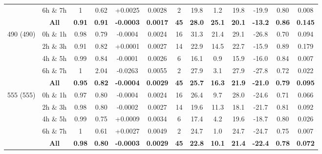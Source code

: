 \documentclass[onecolumn,3p,letterpaper,11pt]{elsarticle}
\begin{document}
\begin{table}[htbp!]
\begin{tabular}{ccccccccccccc}
                            &  6h $\&$ 7h  & 1       & 0.62    & +0.0025 & 0.0028      & 2   & 19.8    &  1.2        & 19.8        & -19.9    & 0.80    & 0.008   \\ 
                              &  \textbf{All}         & \textbf{0.91}    & \textbf{0.91}    & \textbf{-0.0003} & \textbf{0.0017}      & \textbf{45}  & \textbf{28.0}    & \textbf{25.1}        & \textbf{20.1}        & \textbf{-13.2}    & \textbf{0.86}    & \textbf{0.145}   \\ \hline 
\multirow{5}{*}{490 (490)}  &  0h $\&$ 1h  & 0.98    & 0.79    & -0.0004 & 0.0024      & 16  & 31.3    & 21.4        & 29.1        & -26.8    & 0.70    & 0.094   \\ 
                            &  2h $\&$ 3h  & 0.91    & 0.82    & +0.0001 & 0.0027      & 14  & 22.9    & 14.5        & 22.7        & -15.9    & 0.89    & 0.179   \\ 
                            &  4h $\&$ 5h  & 0.99    & 0.84    & -0.0001 & 0.0026      & 6   & 16.1    &  0.9        & 15.9        & -16.0    & 0.84    & 0.007   \\ 
                            &  6h $\&$ 7h  & 1       & 2.04    & -0.0263 & 0.0055      & 2   & 27.9    &  3.1        & 27.9        & -27.8    & 0.72    & 0.022   \\ 
                              &  \textbf{All}         & \textbf{0.95}    & \textbf{0.82}    & \textbf{-0.0004} & \textbf{0.0029}      & \textbf{45}  & \textbf{25.7}    & \textbf{16.3}        & \textbf{21.9}        & \textbf{-21.0}    & \textbf{0.79}    & \textbf{0.095}   \\ \hline 
\multirow{5}{*}{555 (555)}  &  0h $\&$ 1h  & 0.97    & 0.80    & -0.0004 & 0.0024      & 16  & 26.4    &  9.7        & 28.0        & -24.6    & 0.71    & 0.066   \\ 
                            &  2h $\&$ 3h  & 0.98    & 0.80    & -0.0002 & 0.0027      & 14  & 19.6    & 11.3        & 18.1        & -21.7    & 0.81    & 0.092   \\ 
                            &  4h $\&$ 5h  & 0.99    & 0.75    & +0.0009 & 0.0034      & 6   & 17.4    &  4.2        & 19.6        & -18.7    & 0.80    & 0.026   \\ 
                            &  6h $\&$ 7h  & 1       & 0.61    & +0.0027 & 0.0049      & 2   & 24.7    &  1.0        & 24.7        & -24.7    & 0.75    & 0.007   \\ 
                              &  \textbf{All}         & \textbf{0.98}    & \textbf{0.80}    & \textbf{-0.0003} & \textbf{0.0029}      & \textbf{45}  & \textbf{22.8}    & \textbf{10.1}        & \textbf{21.4}        & \textbf{-22.4}    & \textbf{0.78}    & \textbf{0.072}   \\ \hline 

\end{tabular}
\end{table}
\end{document}
